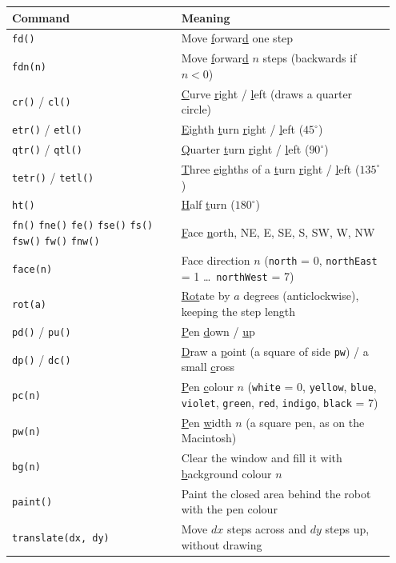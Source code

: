 \documentclass[11pt,a4paper]{article}
\newcommand{\kbd}[1]{\texttt{#1}}
\begin{document}
\begin{longtable}{@{}p{0.42\linewidth} p{0.53\linewidth}@{}}
\toprule
\textbf{Command} & \textbf{Meaning} \\
\midrule
\endhead
\bottomrule
\endfoot
\kbd{fd()} & Move \underline{f}orwar\underline{d} one step \\
\kbd{fdn(n)} & Move \underline{f}orwar\underline{d} $n$ steps (backwards if $n < 0$) \\
\kbd{cr()} / \kbd{cl()} & \underline{C}urve \underline{r}ight / \underline{l}eft (draws a quarter circle) \\
\kbd{etr()} / \kbd{etl()} & \underline{E}ighth \underline{t}urn \underline{r}ight / \underline{l}eft ($45^\circ$) \\
\kbd{qtr()} / \kbd{qtl()} & \underline{Q}uarter \underline{t}urn \underline{r}ight / \underline{l}eft ($90^\circ$) \\
\kbd{tetr()} / \kbd{tetl()} & \underline{T}hree \underline{e}ighths of a \underline{t}urn \underline{r}ight / \underline{l}eft ($135^\circ$) \\
\kbd{ht()} & \underline{H}alf \underline{t}urn ($180^\circ$) \\
\kbd{fn()} \kbd{fne()} \kbd{fe()} \kbd{fse()} \kbd{fs()} \kbd{fsw()} \kbd{fw()} \kbd{fnw()} & \underline{F}ace \underline{n}orth, NE, E, SE, S, SW, W, NW \\
\kbd{face(n)} & Face direction $n$ (\kbd{north} = 0, \kbd{northEast} = 1 \dots\ \kbd{northWest} = 7) \\
\kbd{rot(a)} & \underline{Rot}ate by $a$ degrees (anticlockwise), keeping the step length \\
\kbd{pd()} / \kbd{pu()} & \underline{P}en \underline{d}own / \underline{u}p \\
\kbd{dp()} / \kbd{dc()} & \underline{D}raw a \underline{p}oint (a square of side \kbd{pw}) / a small \underline{c}ross \\
\kbd{pc(n)} & \underline{P}en \underline{c}olour $n$ (\kbd{white} = 0, \kbd{yellow}, \kbd{blue}, \kbd{violet}, \kbd{green}, \kbd{red}, \kbd{indigo}, \kbd{black} = 7) \\
\kbd{pw(n)} & \underline{P}en \underline{w}idth $n$ (a square pen, as on the Macintosh) \\
\kbd{bg(n)} & Clear the window and fill it with \underline{b}ack\underline{g}round colour $n$ \\
\kbd{paint()} & Paint the closed area behind the robot with the pen colour \\
\kbd{translate(dx, dy)} & Move $dx$ steps across and $dy$ steps up, without drawing \\

\end{longtable}
\end{document}
